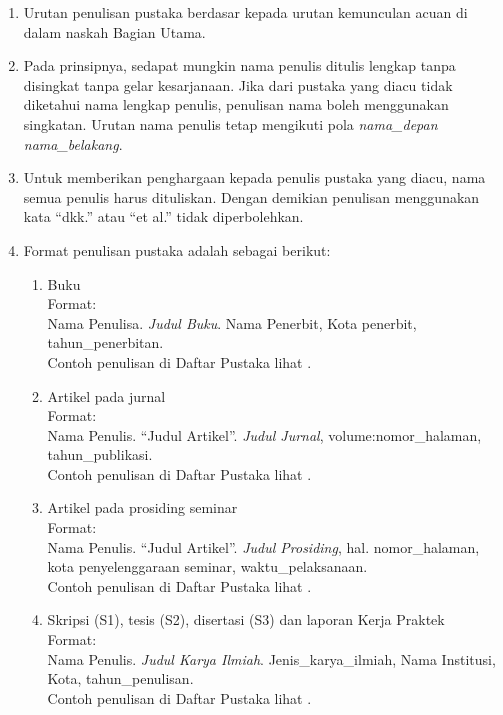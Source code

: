 \begin{enumerate}[label=\alph*)]
\item Urutan penulisan pustaka berdasar kepada urutan kemunculan acuan di dalam naskah
Bagian Utama.
\item Pada prinsipnya, sedapat mungkin nama penulis ditulis lengkap tanpa disingkat tanpa
gelar kesarjanaan. Jika dari pustaka yang diacu tidak diketahui nama lengkap penulis,
penulisan nama boleh menggunakan singkatan. Urutan nama penulis tetap mengikuti
pola \textit{nama\_depan nama\_belakang}.

\item Untuk memberikan penghargaan kepada penulis pustaka yang diacu, nama semua
penulis harus dituliskan. Dengan demikian penulisan menggunakan kata ``dkk.'' atau
``et al.'' tidak diperbolehkan.

\item Format penulisan pustaka adalah sebagai berikut:
  
 \begin{enumerate}[label=\roman*)]
    \item Buku \\
          Format: \\
          Nama Penulisa. \textit{Judul Buku}. Nama Penerbit, Kota penerbit, tahun\_penerbitan. \\
         Contoh penulisan di Daftar Pustaka lihat \cite{book1, book2}.

    \item Artikel pada jurnal \\
	  Format: \\
	  Nama Penulis. ``Judul Artikel''. \textit{Judul Jurnal}, volume:nomor\_halaman, tahun\_publikasi. \\
Contoh penulisan di Daftar Pustaka lihat \cite{article1}.

     \item Artikel pada prosiding seminar \\
	Format: \\
	Nama Penulis. ``Judul Artikel''. \textit{Judul Prosiding}, hal. nomor\_halaman, kota penyelenggaraan seminar, waktu\_pelaksanaan. \\
         Contoh penulisan di Daftar Pustaka lihat \cite{proceeding1}.


	\item Skripsi (S1), tesis (S2), disertasi (S3) dan laporan Kerja Praktek \\
		Format: \\
		Nama Penulis. \textit{Judul Karya Ilmiah}. Jenis\_karya\_ilmiah, Nama Institusi, Kota, tahun\_penulisan.\\
		Contoh penulisan di Daftar Pustaka lihat \cite{skripsi, tesis, disertasi, kp}.


\end{enumerate}
\end{enumerate}
